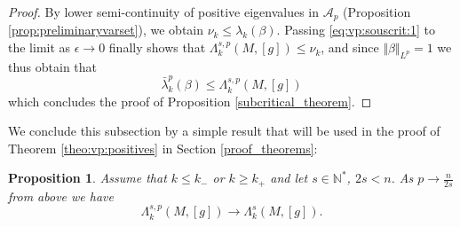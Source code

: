 \documentclass[10pt]{amsart}
\numberwithin{equation}{section}
\def\La{{\Lambda}}
\def\ep{{\varepsilon}}
\newcommand{\vp}{\varphi}
\def \ep{\epsilon}
\theoremstyle{plain}
\newtheorem{prop}[theo]{Proposition}%
\theoremstyle{remark}
\begin{document}
\begin{proof}
By lower semi-continuity of positive eigenvalues in $\mathcal{A}_p$ (Proposition \ref{prop:preliminaryvarset}), we obtain $\nu_k \leq \lambda_k(\beta)$. Passing \eqref{eq:vp:souscrit:1} to the limit as $\ep \to 0$ finally shows that $ \Lambda_k^{s,p}(M,[g]) \le \nu_k$, and since $\Vert \beta \Vert_{L^p} = 1$ we thus obtain that 
$$ \bar{\lambda}_k^p(\beta) \le \Lambda_k^{s,p}(M,[g]) $$
which concludes the proof of Proposition \ref{subcritical_theorem}.
\end{proof}

We conclude this subsection by a simple result that will be used in the proof of Theorem \ref{theo:vp:positives} in Section \ref{proof_theorems}:

\begin{prop} \label{CVLambdap}
Assume that $k \le k_-$ or $k \ge k_+$ and let $s \in \mathbb{N}^*$, $2s < n$. As $p \to \frac{n}{2s}$ from above we have 
$$ \La_k^{s,p}(M,[g])  \to  \La_k^{s}(M,[g]).$$
\end{prop}
\end{document}
